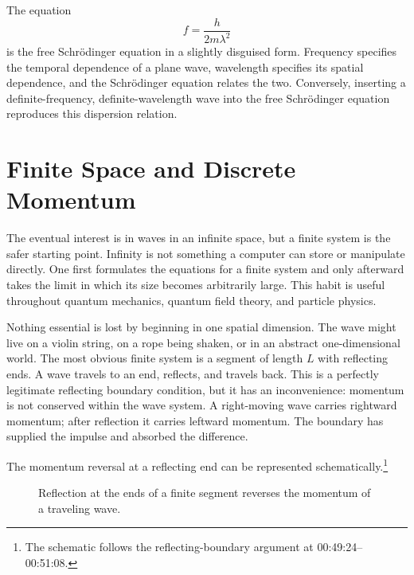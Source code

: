 The equation
\begin{equation}
f=\frac{h}{2m\lambda^2}
\end{equation}
is the free Schr\"odinger equation in a slightly disguised form. Frequency specifies the temporal dependence of a plane wave, wavelength specifies its spatial dependence, and the Schr\"odinger equation relates the two. Conversely, inserting a definite-frequency, definite-wavelength wave into the free Schr\"odinger equation reproduces this dispersion relation.

\begin{classroomqa}
\end{classroomqa}

\section{Finite Space and Discrete Momentum}

The eventual interest is in waves in an infinite space, but a finite system is the safer starting point. Infinity is not something a computer can store or manipulate directly. One first formulates the equations for a finite system and only afterward takes the limit in which its size becomes arbitrarily large. This habit is useful throughout quantum mechanics, quantum field theory, and particle physics.

Nothing essential is lost by beginning in one spatial dimension. The wave might live on a violin string, on a rope being shaken, or in an abstract one-dimensional world. The most obvious finite system is a segment of length \(L\) with reflecting ends. A wave travels to an end, reflects, and travels back. This is a perfectly legitimate reflecting boundary condition, but it has an inconvenience: momentum is not conserved within the wave system. A right-moving wave carries rightward momentum; after reflection it carries leftward momentum. The boundary has supplied the impulse and absorbed the difference.

The momentum reversal at a reflecting end can be represented schematically.\footnote{The schematic follows the reflecting-boundary argument at 00:49:24--00:51:08.}

\begin{figure}[t]
\centering
{}
\caption{Reflection at the ends of a finite segment reverses the momentum of a traveling wave.}
\end{figure}

